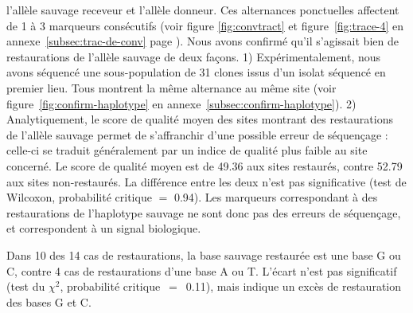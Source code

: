 l'allèle sauvage receveur et l'allèle donneur. Ces alternances ponctuelles
affectent de 1 à 3 marqueurs consécutifs (voir figure \ref{fig:convtract} et
figure~\ref{fig:trace-4} en annexe~\ref{subsec:trac-de-conv}
page \pageref{fig:trace-4}). Nous avons confirmé qu'il s'agissait bien de
restaurations de l'allèle sauvage de deux façons. 1) Expérimentalement, nous
avons séquencé une sous-population de \num{31} clones issus d'un isolat séquencé en
premier lieu. Tous montrent la même alternance au même site (voir
figure~\ref{fig:confirm-haplotype} en annexe~\ref{subsec:confirm-haplotype}). 2)
Analytiquement, le score de qualité moyen des sites montrant des restaurations
de l'allèle sauvage permet de s'affranchir d'une possible erreur de séquençage :
celle-ci se traduit généralement par un indice de qualité plus faible au site
concerné. Le score de qualité moyen est de \num{49.36} aux sites restaurés,
contre \num{52.79} aux sites non-restaurés. La différence entre les deux n'est
pas significative (test de Wilcoxon, probabilité critique \(=\) \num{0.94}). Les
marqueurs correspondant à des restaurations de l'haplotype sauvage ne sont donc
pas des erreurs de séquençage, et correspondent à un signal biologique.

Dans 10 des 14 cas de restaurations, la base sauvage restaurée est une base G ou
C, contre 4 cas de restaurations d'une base A ou T. L'écart n'est pas
significatif (test du $\chi^2$, probabilité critique~\(=\)~\num{0.11}), mais
indique un excès de restauration des bases G et C.



